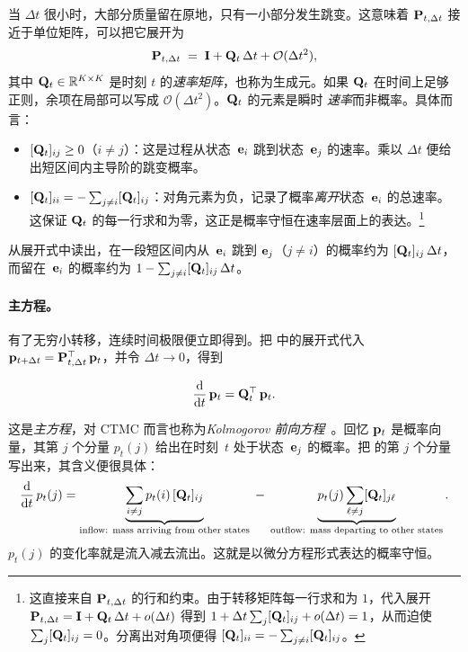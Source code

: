 当 $\Delta t$ 很小时，大部分质量留在原地，只有一小部分发生跳变。这意味着 ${\mathbf{P}}_{t,\Delta t}$ 接近于单位矩阵，可以把它展开为
\begin{equation}
{\mathbf{P}}_{t,\Delta t}
\;=\; {\mathbf{I}} + {\mathbf{Q}}_t\,\Delta t + \mathcal{O}(\Delta t^2),
\label{eq:generator-expansion}
\end{equation}
其中 ${\mathbf{Q}}_t \in \mathbb{R}^{K \times K}$ 是时刻 $t$ 的\emph{速率矩阵}，也称为生成元。如果 ${\mathbf{Q}}_t$ 在时间上足够正则，余项在局部可以写成 $\mathcal{O}(\Delta t^2)$。${\mathbf{Q}}_t$ 的元素是瞬时
\emph{速率}而非概率。具体而言：
\begin{itemize}[leftmargin=2em]
    \item $[{\mathbf{Q}}_t]_{ij} \geq 0$（$i \neq j$）：这是过程从状态~${\mathbf{e}}_i$ 跳到状态~${\mathbf{e}}_j$ 的速率。乘以 $\Delta t$ 便给出短区间内主导阶的跳变概率。
    \item $[{\mathbf{Q}}_t]_{ii} = -\sum_{j \neq i} [{\mathbf{Q}}_t]_{ij}$：对角元素为负，记录了概率\emph{离开}状态~${\mathbf{e}}_i$ 的总速率。这保证 ${\mathbf{Q}}_t$ 的每一行求和为零，这正是概率守恒在速率层面上的表达。\footnote{这直接来自 ${\mathbf{P}}_{t,\Delta t}$ 的行和约束。由于转移矩阵每一行求和为 $1$，代入展开 ${\mathbf{P}}_{t,\Delta t} = {\mathbf{I}} + {\mathbf{Q}}_t\,\Delta t + o(\Delta t)$ 得到 $1 + \Delta t \sum_{j} [{\mathbf{Q}}_t]_{ij} + o(\Delta t) = 1$，从而迫使 $\sum_{j} [{\mathbf{Q}}_t]_{ij} = 0$。分离出对角项便得 $[{\mathbf{Q}}_t]_{ii} = -\sum_{j \neq i} [{\mathbf{Q}}_t]_{ij}$。}
\end{itemize}
从展开式中读出，在一段短区间内从~${\mathbf{e}}_i$ 跳到 ${\mathbf{e}}_j$（$j\neq i$）的概率约为 $[{\mathbf{Q}}_t]_{ij}\,\Delta t$，而留在~${\mathbf{e}}_i$ 的概率约为 $1 - \sum_{j \neq i} [{\mathbf{Q}}_t]_{ij}\,\Delta t$。

\paragraph{主方程。}
有了无穷小转移，连续时间极限便立即得到。把  中的展开式代入 ${\mathbf{p}}_{t+\Delta t} = {\mathbf{P}}_{t,\Delta t}^\top\,{\mathbf{p}}_t$，并令 $\Delta t \to 0$，得到
\begin{mdframed}
\begin{equation}
\frac{\mathop{}\!\mathrm{d}}{\mathop{}\!\mathrm{d} t}\,{\mathbf{p}}_t = {\mathbf{Q}}_t^\top\,{\mathbf{p}}_t.
\label{eq:master-equation-vector}
\end{equation}
\end{mdframed}
这是\emph{主方程}，对 CTMC 而言也称为\emph{Kolmogorov 前向方程}~\citep{norris1998markov}。回忆 ${\mathbf{p}}_t$ 是概率向量，其第 $j$ 个分量 $p_t(j)$ 给出在时刻~$t$ 处于状态~${\mathbf{e}}_j$ 的概率。把  的第 $j$ 个分量写出来，其含义便很具体：
\begin{equation}
\frac{\mathop{}\!\mathrm{d}}{\mathop{}\!\mathrm{d} t}\,p_t(j)
= \underbrace{\sum_{i \neq j} p_t(i)\,[{\mathbf{Q}}_t]_{ij}}_{\text{inflow: mass arriving from other states}}
\;-\;
\underbrace{p_t(j)\sum_{\ell \neq j} [{\mathbf{Q}}_t]_{j\ell}}_{\text{outflow: mass departing to other states}}.
\label{eq:master-equation-component}
\end{equation}
$p_t(j)$ 的变化率就是流入减去流出。这就是以微分方程形式表达的概率守恒。

